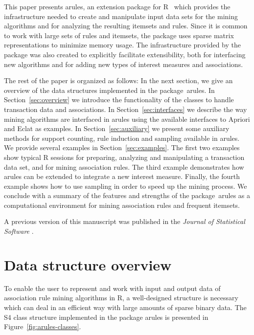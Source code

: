 \documentclass[10pt,a4paper]{article}
\newcommand{\strong}[1]{{\normalfont\fontseries{b}\selectfont #1}}
\newcommand{\pkg}[1]{\strong{#1}}
\newcommand{\proglang}[1]{\textsf{#1}}
\begin{document}
This paper presents \pkg{arules}, an extension package for
\proglang{R}~\citep{arules:R:2005} which provides the infrastructure
needed to create and manipulate input data sets for the mining
algorithms and for analyzing the resulting itemsets and rules.  Since it
is common to work with large sets of rules and itemsets, the package
uses sparse matrix representations to minimize memory usage.  The
infrastructure provided by the package was also created to explicitly
facilitate extensibility, both for interfacing new algorithms and for
adding new types of interest measures and associations.

The rest of the paper is organized as follows: In the next section, we
give an overview of the data structures implemented in the
package~\pkg{arules}.
In Section~\ref{sec:overview} we introduce the functionality of the
classes to handle transaction data and associations.  In
Section~\ref{sec:interfaces} we describe the way mining algorithms are
interfaced in \pkg{arules} using the available interfaces to Apriori and
Eclat as examples.  In Section~\ref{sec:auxiliary} we present some
auxiliary methods for support counting, rule induction and sampling
available in \pkg{arules}.  We provide several examples in
Section~\ref{sec:examples}.  The first two examples show typical
\proglang{R} sessions for preparing, analyzing and manipulating a
transaction data set, and for mining association rules.  The third
example demonstrates how \pkg{arules} can be extended to integrate a new
interest measure.  Finally, the fourth example shows how to use sampling
in order to speed up the mining process.  We conclude with a summary of
the features and strengths of the package~\pkg{arules} as a
computational environment for mining association rules and frequent
itemsets.

A previous version of this manuscript was published in the \emph{Journal
  of Statistical Software} \citep{arules:Hahsler+Gruen+Hornik:2005b}.


\section{Data structure overview\label{sec:overview}}

To enable the user to represent and work with input and output data of
association rule mining algorithms in \proglang{R}, a well-designed
structure is necessary which can deal in an efficient way with large
amounts of sparse binary data.  The \proglang{S4} class structure
implemented in the package \pkg{arules} is presented in
Figure~\ref{fig:arules-classes}.
\end{document}
